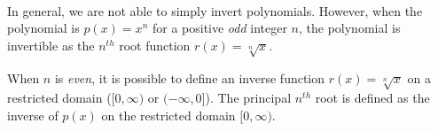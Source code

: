 \documentclass{ximera}
\begin{document}
%
%

\begin{summary}
\\
In general, we are not able to simply invert polynomials.
However, when the polynomial is $p(x) = x^n$ for a positive {\em odd} integer $n$, the polynomial is invertible as the $n^{th}$ root function $r(x) = \sqrt[n]{x}$.

When $n$ is {\em even}, it is possible to define an inverse function $r(x) = \sqrt[n]{x}$ on a restricted domain ($[0, \infty)$ or $(-\infty,0]$). The principal $n^{th}$ root is defined as the inverse of $p(x)$ on the restricted domain $[0,\infty)$.
\end{summary}
\end{document}

